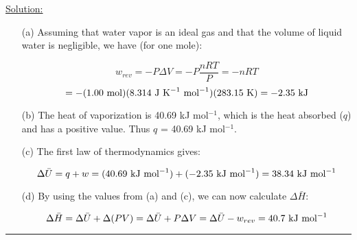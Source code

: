 \noindent
\underline{Solution:}\\

\begin{itemize}

\item[(a)] Assuming that water vapor is an ideal gas and that the volume of liquid water is negligible, we have (for one mole):

$$w_{rev} = -P\Delta V = -P\frac{nRT}{P} = -nRT$$
$$ = -(1.00\textnormal{ mol})(8.314\textnormal{ J K}^{-1}\textnormal{ mol}^{-1})(283.15\textnormal{ K}) = -2.35\textnormal{ kJ}$$

\item[(b)] The heat of vaporization is 40.69 kJ mol$^{-1}$, which is the heat absorbed ($q$) and has a positive value. Thus $q$ = 40.69 kJ mol$^{-1}$.

\item[(c)] The first law of thermodynamics gives:

$$\Delta\bar{U} = q + w = (40.69\textnormal{ kJ mol}^{-1}) + (-2.35\textnormal{ kJ mol}^{-1}) = 38.34\textnormal{ kJ mol}^{-1}$$

\item[(d)] By using the values from (a) and (c), we can now calculate $\Delta\bar{H}$:

$$\Delta\bar{H} = \Delta\bar{U} + \Delta(PV) = \Delta\bar{U} + P\Delta V = \Delta\bar{U} - w_{rev} = 40.7\textnormal{ kJ mol}^{-1}$$

\end{itemize}

\hrule\vspace{0.5cm}
